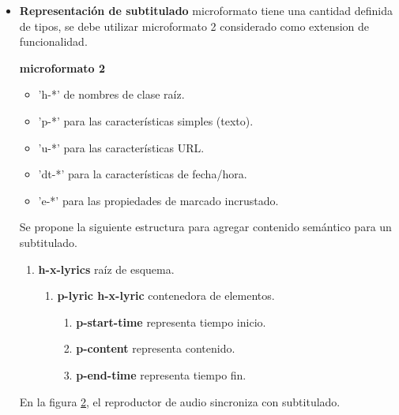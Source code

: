 \begin{itemize}
\begin{figure}[!ht]
	\centering
	\label{fig:Presentación glosario}
\end{figure}

\item \textbf{Representación de subtitulado} microformato tiene una
cantidad definida de tipos, se debe utilizar microformato 2 considerado
como extension de funcionalidad. 

\textbf{microformato 2}

\begin{itemize}

\item 'h-*' de nombres de clase raíz.
\item 'p-*' para las características simples (texto).
\item 'u-*' para las características URL.
\item 'dt-*' para la características de fecha/hora.
\item 'e-*' para las propiedades de marcado incrustado. \cite{microformats2}
 
\end{itemize}

Se propone la siguiente estructura para agregar contenido semántico para un
subtitulado.

\begin{enumerate}

\item \textbf{h-x-lyrics} raíz de esquema.

	\begin{enumerate}
	
		\item \textbf{p-lyric h-x-lyric} contenedora de elementos.
		
			\begin{enumerate}

				\item \textbf{p-start-time} representa tiempo inicio.
				\item \textbf{p-content} representa contenido.
				\item \textbf{p-end-time} representa tiempo fin.			

				\end{enumerate}					

	\end{enumerate}

\end{enumerate}

En la figura \ref{fig:Representación de subtitulado}, el reproductor de audio
sincroniza con subtitulado.

\begin{figure}[!ht]
	\centering
	\label{fig:Representación de subtitulado}
\end{figure}

\end{itemize}

